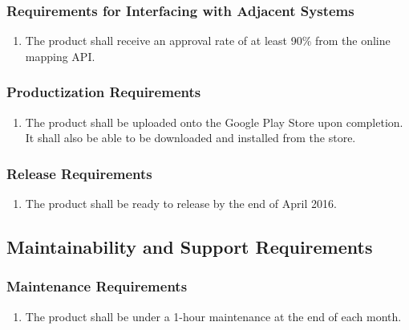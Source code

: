 \documentclass[]{article}
\begin{document}
\subsubsection{Requirements for Interfacing with Adjacent Systems}
\label{ssub:requirements_for_interfacing_with_adjacent_systems}
\begin{enumerate}[{OE}2. ]
	\item The product shall receive an approval rate of at least 90\% from the online mapping API.
\end{enumerate}

\subsubsection{Productization Requirements}
\label{ssub:productization_requirements}
\begin{enumerate}[{OE}3. ]
	\item The product shall be uploaded onto the Google Play Store upon completion. It shall also be able to be downloaded and installed from the store.
\end{enumerate}

\subsubsection{Release Requirements}
\label{ssub:release_requirements}
\begin{enumerate}[{OE}4. ]
	\item The product shall be ready to release by the end of April 2016.
\end{enumerate}


\subsection{Maintainability and Support Requirements}
\label{sub:maintainability_and_support_requirements}

\subsubsection{Maintenance Requirements}
\label{ssub:maintenance_requirements}
\begin{enumerate}[{MS}1. ]
	\item The product shall be under a 1-hour maintenance at the end of each month.
\end{enumerate}
\end{document}
